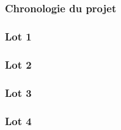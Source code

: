 
\speaker{\Mathieu}
\subsection{} %


\begin{frame}
	\frametitle{Chronologie du projet}
	
\end{frame}


\begin{frame}
	\frametitle{Lot 1}
	
\end{frame}


\speaker{\Michel}
\begin{frame}
	\frametitle{Lot 2}
	
\end{frame}

\begin{frame}
	\frametitle{Lot 3}
	
\end{frame}


\begin{frame}
	\frametitle{Lot 4}
	
\end{frame}